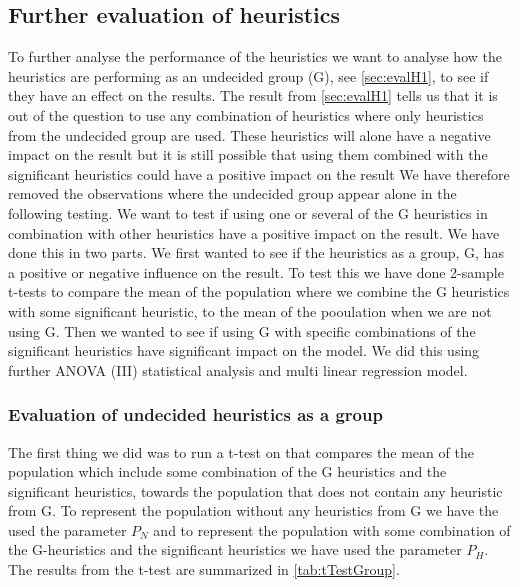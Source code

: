 \documentclass[../main.tex]{subfiles}
\begin{document}
\subsection{Further evaluation of heuristics}
\label{sec:evalH2}
To further analyse the performance of the heuristics we want to analyse how the heuristics are performing as an undecided group (G), see \cref{sec:evalH1}, to see if they have an effect on the results.
The result from \cref{sec:evalH1} tells us that it is out of the question to use any combination of heuristics where only heuristics from the undecided group are used.
These heuristics will alone have a negative impact on the result but it is still possible that using them combined with the significant heuristics could have a positive impact on the result
We have therefore removed the observations where the undecided group appear alone in the following testing.
We want to test if using one or several of the G heuristics in combination with other heuristics have a positive impact on the result.
We have done this in two parts.
We first wanted to see if the heuristics as a group, G, has a positive or negative influence on the result. 
To test this we have done 2-sample t-tests to compare the mean of the population where we combine the G heuristics with some significant heuristic, to the mean of the pooulation when we are not using G. 
Then we wanted to see if using G with specific combinations of the significant heuristics have significant impact on the model. 
We did this using further ANOVA (III) statistical analysis and multi linear regression model.

\subsubsection{Evaluation of undecided heuristics as a group}
The first thing we did was to run a t-test on that compares the mean of the population which include some combination of the G heuristics and the significant heuristics, towards the population that does not contain any heuristic from G. 
To represent the population without any heuristics from G we have the used the parameter $P_N$ and to represent the population with some combination of the G-heuristics and the significant heuristics we have used the parameter $P_H$.
The results from the t-test are summarized in \cref{tab:tTestGroup}.
\end{document}
